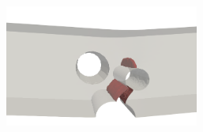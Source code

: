 \begin{frame}
\begin{columns}[T]
\begin{column}{0.6\textwidth}
\begin{figure}
{\begin{subfigure}{0.45\textwidth}
            \centering
            \includegraphics[width=0.7\textwidth]{examples/figures/III}
          \end{subfigure}
        }
        
        \vspace{0.5em}
        

\end{figure}
\end{column}
\end{columns}
\end{frame}
